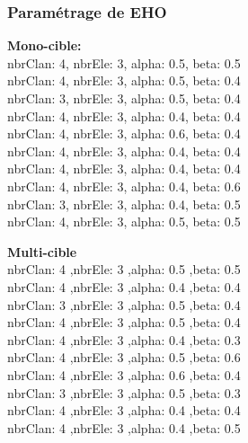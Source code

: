 \subsubsection{Paramétrage de EHO}
\noindent
\begin{minipage}[t]{0.55\textwidth}
	\textbf{Mono-cible:} \\
	nbrClan: 4, nbrEle: 3, alpha: 0.5, beta: 0.5\\
	nbrClan: 4, nbrEle: 3, alpha: 0.5, beta: 0.4\\
	nbrClan: 3, nbrEle: 3, alpha: 0.5, beta: 0.4\\
	nbrClan: 4, nbrEle: 3, alpha: 0.4, beta: 0.4\\
	nbrClan: 4, nbrEle: 3, alpha: 0.6, beta: 0.4\\
	nbrClan: 4, nbrEle: 3, alpha: 0.4, beta: 0.4\\
	nbrClan: 4, nbrEle: 3, alpha: 0.4, beta: 0.4\\
	nbrClan: 4, nbrEle: 3, alpha: 0.4, beta: 0.6\\
	nbrClan: 3, nbrEle: 3, alpha: 0.4, beta: 0.5\\
	nbrClan: 4, nbrEle: 3, alpha: 0.5, beta: 0.5\\
	
\end{minipage}\hfill
\hspace{0.2cm}
\begin{minipage}[t]{0.55\textwidth}
	\textbf{Multi-cible}\\
	 nbrClan: 4 ,nbrEle: 3 ,alpha: 0.5 ,beta: 0.5\\
	 nbrClan: 4 ,nbrEle: 3 ,alpha: 0.4 ,beta: 0.4\\
	 nbrClan: 3 ,nbrEle: 3 ,alpha: 0.5 ,beta: 0.4\\
	 nbrClan: 4 ,nbrEle: 3 ,alpha: 0.5 ,beta: 0.4\\
	 nbrClan: 4 ,nbrEle: 3 ,alpha: 0.4 ,beta: 0.3\\
	 nbrClan: 4 ,nbrEle: 3 ,alpha: 0.5 ,beta: 0.6\\
	 nbrClan: 4 ,nbrEle: 3 ,alpha: 0.6 ,beta: 0.4\\
	 nbrClan: 3 ,nbrEle: 3 ,alpha: 0.5 ,beta: 0.3\\
	 nbrClan: 4 ,nbrEle: 3 ,alpha: 0.4 ,beta: 0.4\\
	 nbrClan: 4 ,nbrEle: 3 ,alpha: 0.4 ,beta: 0.5\\
\end{minipage}\hfill


